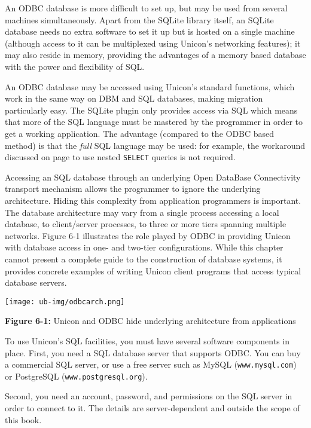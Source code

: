 An ODBC database is more difficult to set up, but may be used from
several machines simultaneously. Apart from the SQLite library itself,
an SQLite database needs no extra software to set it up but is hosted
on a single machine (although access to it can be multiplexed using
Unicon's networking features); it may also reside in memory, providing
the advantages of a memory based database with the power and
flexibility of SQL.

An ODBC database may be accessed using Unicon's standard functions, which
work in the same way on DBM and SQL databases, making migration
particularly easy. The SQLite plugin only provides access via SQL which
means that more of the SQL language must be mastered by the programmer in
order to get a working application. The advantage (compared to the ODBC
based method) is that the {\em full\/} SQL language may be used: for example,
the workaround discussed on page \pageref{NestedSQL} to use nested
\texttt{SELECT} queries is not required.

Accessing an SQL database through an underlying Open
DataBase Connectivity transport mechanism allows
the programmer to ignore the underlying architecture. Hiding this
complexity from application programmers is important. The database
architecture may vary from a single process accessing a local database,
to client/server processes, to three or more tiers spanning multiple
networks. Figure 6-1 illustrates the role played by ODBC in providing
Unicon with database access in one- and two-tier configurations. While
this chapter cannot present a complete guide to the construction of
database systems, it provides concrete examples of writing Unicon
client programs that access typical database servers.

\begin{center}
\texttt{[image: ub-img/odbcarch.png]}
\end{center}

{\sffamily\bfseries Figure 6-1:}
{\sffamily Unicon and ODBC hide underlying architecture from
 applications}

\bigskip

To use Unicon's SQL facilities, you must have several
software components in place. First, you need a SQL database server that
supports ODBC. You can buy a commercial SQL server, or
use a free server such as MySQL
(\texttt{www.mysql.com}) or PostgreSQL
(\texttt{www.postgresql.org}).

Second, you need an account, password, and permissions on the SQL
server in order to connect to it. The details are
server-dependent and outside the scope of this book.

